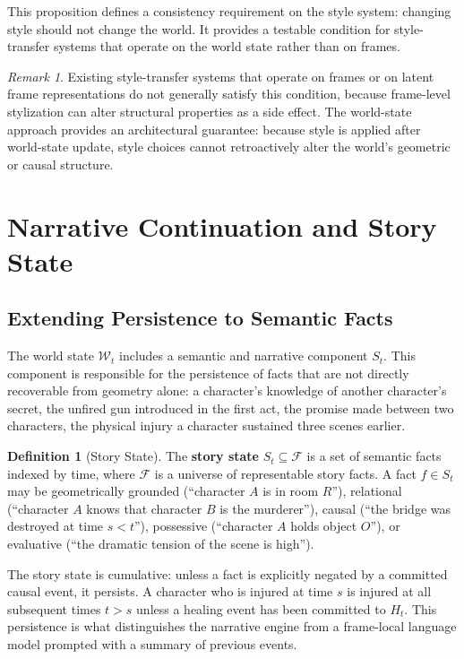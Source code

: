 \documentclass[11pt,a4paper]{article}
\theoremstyle{plain}
\theoremstyle{definition}
\newtheorem{definition}[theorem]{Definition}
\theoremstyle{remark}
\newtheorem{remark}[theorem]{Remark}
\begin{document}
This proposition defines a consistency requirement on the style system: changing style should not change the world. It provides a testable condition for style-transfer systems that operate on the world state rather than on frames.

\begin{remark}
Existing style-transfer systems that operate on frames or on latent frame representations do not generally satisfy this condition, because frame-level stylization can alter structural properties as a side effect. The world-state approach provides an architectural guarantee: because style is applied after world-state update, style choices cannot retroactively alter the world's geometric or causal structure.
\end{remark}

\section{Narrative Continuation and Story State}
\label{sec:narrative}

\subsection{Extending Persistence to Semantic Facts}

The world state $\mathcal{W}_t$ includes a semantic and narrative component $S_t$. This component is responsible for the persistence of facts that are not directly recoverable from geometry alone: a character's knowledge of another character's secret, the unfired gun introduced in the first act, the promise made between two characters, the physical injury a character sustained three scenes earlier.

\begin{definition}[Story State]
The \textbf{story state} $S_t \subseteq \mathcal{F}$ is a set of semantic facts indexed by time, where $\mathcal{F}$ is a universe of representable story facts. A fact $f \in S_t$ may be geometrically grounded (``character $A$ is in room $R$''), relational (``character $A$ knows that character $B$ is the murderer''), causal (``the bridge was destroyed at time $s < t$''), possessive (``character $A$ holds object $O$''), or evaluative (``the dramatic tension of the scene is high'').
\end{definition}

The story state is cumulative: unless a fact is explicitly negated by a committed causal event, it persists. A character who is injured at time $s$ is injured at all subsequent times $t > s$ unless a healing event has been committed to $H_t$. This persistence is what distinguishes the narrative engine from a frame-local language model prompted with a summary of previous events.
\end{document}
